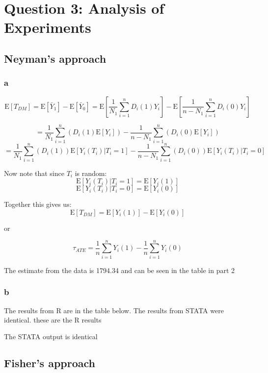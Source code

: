 \documentclass[11pt]{article}
\newcommand{\E}{\mathrm{E}}
\begin{document}
 
 \section{Question 3: Analysis of Experiments}
 
 
 \subsection{Neyman's approach}
 
 \subsubsection{a}
 
 $$\E[T_{DM}] = \E[\bar{Y}_1] - \E[\bar{Y}_0] = \E \left[ \frac{1}{N_1} \sum_{i=1}^{n} D_i(1) Y_i  \right]  
 -  \E \left[ \frac{1}{n-N_1} \sum_{i=1}^{n} D_i(0) Y_i  \right]  $$
 
 $$ =  \frac{1}{N_1} \sum_{i=1}^{n} \left(  D_i(1) \E[Y_i] \right) - \frac{1}{n-N_1} \sum_{i=1}^{n} \left(  D_i(0) \E[Y_i] \right) $$
 $$=  \frac{1}{N_1} \sum_{i=1}^{n} \left( D_i(1) \right) \E[Y_i(T_i)|T_i = 1]  - \frac{1}{n-N_1} \sum_{i=1}^{n} \left( D_i(0) \right) \E[Y_i(T_i)|T_i =0] $$
 
 Now note that since $T_i$ is random: 
 $$ \E[Y_i(T_i)|T_i = 1] = \E[Y_i(1)] $$
 $$ \E[Y_i(T_i)|T_i = 0] = \E[Y_i(0)] $$
 
 Together this gives us: 
  $$\E[T_{DM}] = \E[Y_i(1)] - \E[Y_i(0)] $$
  
 or
 
 $$\tau_{ATE} = \frac{1}{n} \sum_{i=1}^{n} Y_i(1) - \frac{1}{n} \sum_{i=1}^{n} Y_i(0) $$
 
 The estimate from the data is 1794.34 and can be seen in the table in part 2
 
  \subsubsection{b}
 
 The results from R are in the table below. The results from STATA were identical. these are the R results 
 \begin{center}
 	
  	
 \end{center}

The STATA output is identical 

 
 \subsection{Fisher's approach}
\end{document}
